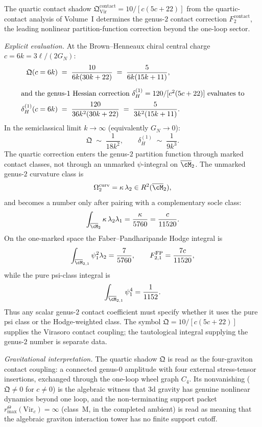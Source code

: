 \begin{computation}
\label{comp:gravity-quartic-correction}%
%
The quartic contact shadow
$\mathfrak{Q}^{\mathrm{contact}}_{\mathrm{Vir}} = 10/[c(5c+22)]$
from the quartic-contact analysis of Volume~I
determines the genus-$2$ contact correction
$F_2^{\mathrm{contact}}$, the
leading nonlinear partition-function correction beyond the
one-loop sector.

\emph{Explicit evaluation.} At the Brown--Henneaux chiral central
charge $c = 6k = 3\ell/(2G_N)$:
\begin{alignat*}{2}
\mathfrak{Q}(c = 6k)
\;&=\;
\frac{10}{6k(30k+22)}
\;=\;
\frac{5}{6k(15k+11)},
\\[4pt]
\intertext{and the genus-$1$ Hessian correction
$\delta_H^{(1)} = 120/[c^2(5c+22)]$ evaluates to}
\delta_H^{(1)}(c = 6k)
\;&=\;
\frac{120}{36k^2(30k+22)}
\;=\;
\frac{5}{3k^2(15k+11)}.
\end{alignat*}
In the semiclassical limit $k \to \infty$ (equivalently
$G_N \to 0$):
\[
\mathfrak{Q} \;\sim\; \frac{1}{18k^2},
\qquad
\delta_H^{(1)} \;\sim\; \frac{1}{9k^3}.
\]
The quartic correction enters the genus-$2$ partition function
through marked contact classes, not through an unmarked
$\psi$-integral on $\overline{\cM}_2$.  The unmarked genus-$2$
curvature class is
\[
  \Omega_2^{\mathrm{curv}}=\kappa\,\lambda_2
  \in R^2(\overline{\cM}_2),
\]
and becomes a number only after pairing with a complementary socle
class:
\[
  \int_{\overline{\cM}_2}\kappa\,\lambda_2\lambda_1
  =
  \frac{\kappa}{5760}
  =
  \frac{c}{11520}.
\]
On the one-marked space the Faber--Pandharipande Hodge integral is
\[
  \int_{\overline{\cM}_{2,1}}\psi_1^2\lambda_2
  =
  \frac{7}{5760},
  \qquad
  F_{2,1}^{\mathrm{FP}}=\frac{7c}{11520},
\]
while the pure psi-class integral is
\[
  \int_{\overline{\cM}_{2,1}}\psi_1^4=\frac{1}{1152}.
\]
Thus any scalar genus-$2$ contact coefficient must specify whether it
uses the pure psi class or the Hodge-weighted class.  The symbol
$\mathfrak Q=10/[c(5c+22)]$ supplies the Virasoro contact coupling;
the tautological integral supplying the genus-$2$ number is separate
data.

\emph{Gravitational interpretation.}
The quartic shadow $\mathfrak{Q}$ is read as the four-graviton
contact coupling: a connected genus-$0$ amplitude with four external
stress-tensor insertions, exchanged through the one-loop wheel
graph $C_4$. Its nonvanishing ($\mathfrak{Q} \neq 0$ for
$c \neq 0$) is the algebraic witness that $3$d gravity has genuine
nonlinear dynamics beyond one loop,
and the non-terminating support packet
\(r^\Theta_{\max}(\mathrm{Vir}_c)=\infty\)
(class~M, in the completed ambient) is read as meaning that the
algebraic graviton interaction tower has no finite support cutoff.


\end{computation}
